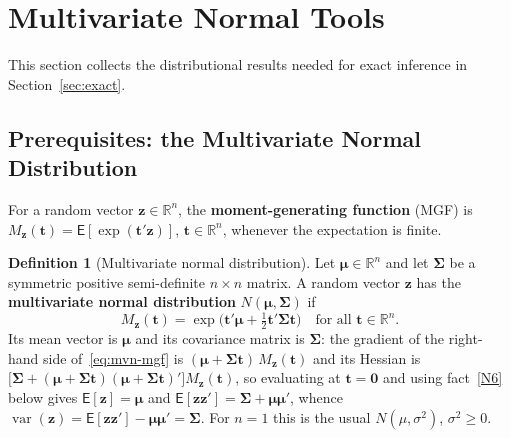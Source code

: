 \documentclass[14pt]{extarticle}
\theoremstyle{plain}
\theoremstyle{definition}
\newtheorem{definition}[theorem]{Definition}
\theoremstyle{remark}
\newcommand\expc{\mathsf{E}}
\DeclareMathOperator\var{var}
\newcommand{\bzero}{\mathbf{0}}
\newcommand{\bz}{\mathbf{z}}
\newcommand{\Real}{\mathbb{R}}
\begin{document}
\section{Multivariate Normal Tools}\label{sec:mvn}

This section collects the distributional results needed for exact inference in Section~\ref{sec:exact}.

\subsection{Prerequisites: the Multivariate Normal Distribution}\label{sec:prereq-prob}

For a random vector $\bz \in \Real^n$, the \textbf{moment-generating function} (MGF) is $M_{\bz}(\mathbf{t}) = \expc[\exp(\mathbf{t}'\bz)]$, $\mathbf{t} \in \Real^n$, whenever the expectation is finite.

\begin{definition}[Multivariate normal distribution]\label{def:mvn}
Let $\boldsymbol\mu \in \Real^n$ and let $\boldsymbol\Sigma$ be a symmetric positive semi-definite $n \times n$ matrix. A random vector $\bz$ has the \textbf{multivariate normal distribution} $N(\boldsymbol\mu, \boldsymbol\Sigma)$ if
\begin{equation}\label{eq:mvn-mgf}
M_{\bz}(\mathbf{t}) = \exp\bigl(\mathbf{t}'\boldsymbol\mu + \tfrac{1}{2}\mathbf{t}'\boldsymbol\Sigma\mathbf{t}\bigr) \quad \text{for all } \mathbf{t} \in \Real^n.
\end{equation}
Its mean vector is $\boldsymbol\mu$ and its covariance matrix is $\boldsymbol\Sigma$: the gradient of the right-hand side of~\eqref{eq:mvn-mgf} is $(\boldsymbol\mu + \boldsymbol\Sigma\mathbf{t})\,M_{\bz}(\mathbf{t})$ and its Hessian is $\bigl[\boldsymbol\Sigma + (\boldsymbol\mu + \boldsymbol\Sigma\mathbf{t})(\boldsymbol\mu + \boldsymbol\Sigma\mathbf{t})'\bigr]M_{\bz}(\mathbf{t})$, so evaluating at $\mathbf{t} = \bzero$ and using fact~\ref{N6} below gives $\expc[\bz] = \boldsymbol\mu$ and $\expc[\bz\bz'] = \boldsymbol\Sigma + \boldsymbol\mu\boldsymbol\mu'$, whence $\var(\bz) = \expc[\bz\bz'] - \boldsymbol\mu\boldsymbol\mu' = \boldsymbol\Sigma$. For $n = 1$ this is the usual $N(\mu, \sigma^2)$, $\sigma^2 \geqslant 0$.
\end{definition}
\end{document}
